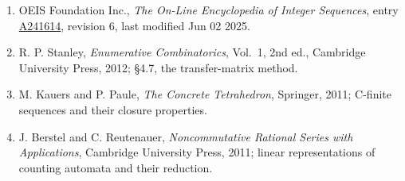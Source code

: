 \documentclass[11pt]{article}
\theoremstyle{definition}
\begin{document}
\begin{enumerate}

\item OEIS Foundation Inc., \emph{The On-Line Encyclopedia of Integer Sequences}, entry \href{https://oeis.org/A241614}{A241614}, revision 6, last modified Jun 02 2025.

\item R. P. Stanley, \emph{Enumerative Combinatorics}, Vol.~1, 2nd ed., Cambridge University Press, 2012; \S4.7, the transfer-matrix method.

\item M. Kauers and P. Paule, \emph{The Concrete Tetrahedron}, Springer, 2011; C-finite sequences and their closure properties.

\item J. Berstel and C. Reutenauer, \emph{Noncommutative Rational Series with Applications}, Cambridge University Press, 2011; linear representations of counting automata and their reduction.

\end{enumerate}
\end{document}
